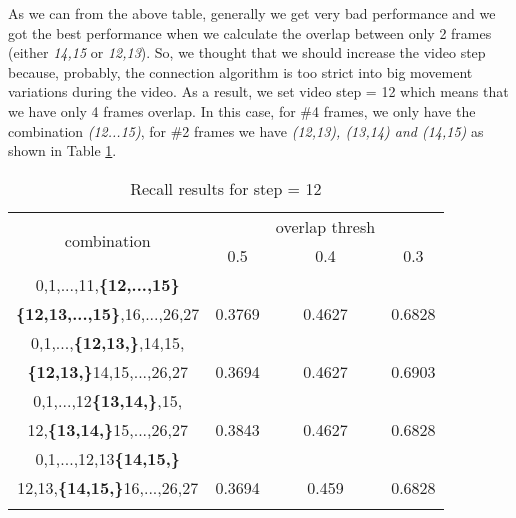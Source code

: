 As we can from the above table, generally we get very bad performance and we got the best performance when we calculate the overlap between only 2 frames (either \textit{14,15} or \textit{12,13}).
So, we thought that we should increase the video step because, probably, the connection algorithm is too strict into big movement variations during  the video. As a result, we set video step = 12 which
means that we have only 4 frames overlap. In this case,  for \#4 frames, we only have the combination \textit{(12...15)}, for \#2 frames we have \textit{(12,13), (13,14) and (14,15)} as shown in
Table \ref{table:step12_16}.

\begin{center}
\begin{longtable}{||c||c c c||}

  \hline
  \multirow{2}{5em}{combination} & {} &overlap thresh & {} \\
                                    &  0.5  &  0.4 &  0.3 \\         
  \hline  \hline
  0,1,...,11,\textbf{\{12,...,15\}}           & {} & {} & {} \\
  \textbf{\{12,13,...,15\}},16,...,26,27         & 0.3769 & 0.4627 & 0.6828 \\
  \hline     \hline                          

  0,1,...,\textbf{\{12,13,\}},14,15,          & {} & {} & {} \\
  \textbf{\{12,13,\}}14,15,...,26,27          & 0.3694   & 0.4627 & 0.6903 \\
  \hline                          
  0,1,...,12\textbf{\{13,14,\}},15,           & {} & {} & {} \\
  12,\textbf{\{13,14,\}}15,...,26,27          & 0.3843   & 0.4627 & 0.6828 \\
  \hline                          
  0,1,...,12,13\textbf{\{14,15,\}}            & {} & {} & {} \\
  12,13,\textbf{\{14,15,\}}16,...,26,27       & 0.3694   & 0.459 & 0.6828 \\
  \hline     \hline                          

  \caption{Recall results for step = 12}
  \label{table:step12_16}
\end{longtable} 
\end{center}

